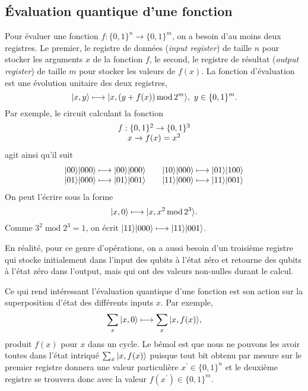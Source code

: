 \subsection{Évaluation quantique d'une fonction}

Pour évaluer une fonction $f:\{0,1\}^n\rightarrow\{0,1\}^{m}$, on a besoin
d'au moins deux registres. Le premier, le registre de données (\emph{input
register}) de taille $n$ pour stocker les arguments $x$ de la fonction $f$, le
second, le registre de résultat (\emph{output register}) de taille $m$ pour
stocker les valeurs de $f(x)$. La fonction d'évaluation est une évolution
unitaire des deux registres,%
\begin{equation}
\vert x,y\rangle \longmapsto\vert x,(y+f(x))\operatorname{mod}2^{m}\rangle,\ y\in\{0,1\}^{m}.
\end{equation}
Par exemple, le circuit calculant la fonction%
\begin{equation}%
\begin{array}
[c]{c}%
f:\{0,1\}^2\rightarrow\{0,1\}^{3}\\
x\rightarrow f(x)=x^2%
\end{array}
\end{equation}
agit ainsi qu'il suit%
\begin{equation}%
\begin{array}
[c]{ccc}%
\ket{00} \ket{000}\longmapsto\ket{00}\ket{000} &  & \ket{10}
\ket{000}\longmapsto\ket{01}\ket{100}\\
\ket{01} \ket{000}\longmapsto\ket{01}\ket{001} &  & \ket{11}
\ket{000}\longmapsto\ket{11}\ket{001}
\end{array}
\end{equation}
On peut l'écrire sous la forme%
\begin{equation}
\vert x,0\rangle \longmapsto\vert x,x^2\operatorname{mod}2^{3}\rangle.
\end{equation}
Comme $3^2\operatorname{mod}2^{3}=1$, on écrit $\vert11\rangle
\vert000\rangle\longmapsto\vert11\rangle\vert001\rangle$.

En réalité, pour ce genre d'opérations, on a aussi besoin d'un troisième
registre qui stocke initialement dans l'input des qubits à l'état zéro et
retourne des qubits à l'état zéro dans l'output, mais qui ont des valeurs
non-nulles durant le calcul.

Ce qui rend intéressant l'évaluation quantique d'une fonction est son action
sur la superposition d'état des différents inputs $x$. Par exemple,%
\begin{equation}
\sum_{x}\vert x,0\rangle \longmapsto\sum_{x}\vert x,f(x)\rangle,
\end{equation}
produit $f(x)$ pour $x$ dans un cycle. Le bémol est que nous ne pouvons les
avoir toutes dans l'état intriqué $\sum_{x}\vert x,f(x)\rangle $ puisque tout bit
obtenu par mesure sur le premier registre donnera une valeur particulière
$x^{\prime}\in\{0,1\}^n$ et le deuxième registre se trouvera donc avec la
valeur $f(x^{\prime})\in\{0,1\}^{m}$.

